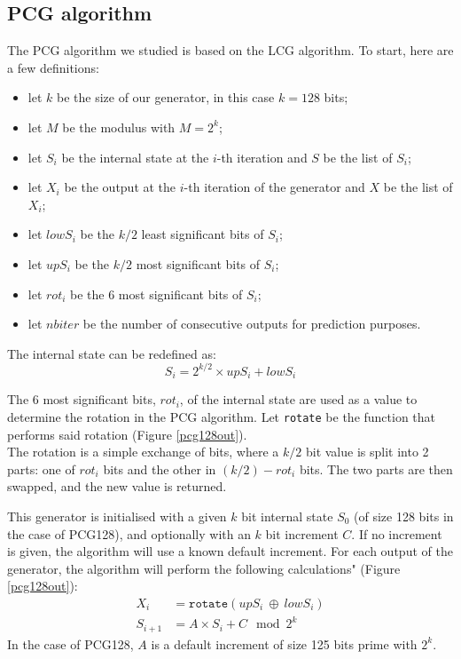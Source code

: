 \documentclass[preprint]{iacrtrans}
\begin{document}
\subsection{PCG algorithm}

The PCG algorithm we studied is based on the LCG algorithm. To start, here are a few definitions:
\begin{itemize}
    \item let $k$ be the size of our generator, in this case $k = 128$ bits;
    \item let $M$ be the modulus with $M = 2^k$;
    \item let $S_i$ be the internal state at the $i$-th iteration and $S$ be the list of $S_i$;
    \item let $X_i$ be the output at the $i$-th iteration of the generator and $X$ be the list of $X_i$;
    \item let $lowS_i$ be the $k/2$ least significant bits of $S_i$;
    \item let $upS_i$ be the $k/2$ most significant bits of $S_i$;
    \item let $rot_i$ be the 6 most significant bits of $S_i$;
    \item let $nbiter$ be the number of consecutive outputs for prediction purposes.
\end{itemize}

The internal state can be redefined as:
\begin{equation}
    S_i = 2^{k/2} \times upS_i + lowS_i 
\end{equation}

The 6 most significant bits, $rot_i$, of the internal state are used as a value to determine the rotation in the PCG algorithm. Let \texttt{rotate} be the function that performs said rotation (Figure \ref{pcg128out}).\\
The rotation is a simple exchange of bits, where a $k/2$ bit value is split into 2 parts: one of $rot_i$ bits and the other in $(k/2) - rot_i$ bits. The two parts are then swapped, and the new value is returned. 

This generator is initialised with a given $k$ bit internal state $S_0$ (of size 128 bits in the case of PCG128), and optionally with an $k$ bit increment $C$. If no increment is given, the algorithm will use a known default increment. For each output of the generator, the algorithm will perform the following calculations" (Figure \ref{pcg128out}):\\
\begin{align}
    X_{i} &= \mathtt{rotate}(upS_i\ \oplus\ lowS_i)\\
    S_{i+1} &= A \times S_{i} + C \mod{2^k}
\end{align}
In the case of PCG128, $A$ is a default increment of size 125 bits prime with $2^k$.
\end{document}
